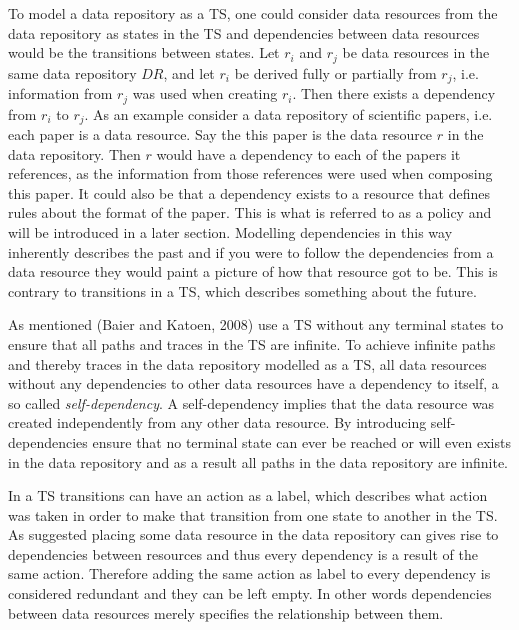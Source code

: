 To model a data repository as a TS, one could consider data resources from the data repository as states in the TS and dependencies between data resources would be the transitions between states. Let $r_i$ and $r_j$ be data resources in the same data repository $DR$, and let $r_i$ be derived fully or partially from $r_j$, i.e. information from $r_j$ was used when creating $r_i$. Then there exists a dependency from $r_i$ to $r_j$. As an example consider a data repository of scientific papers, i.e. each paper is a data resource. Say the this paper is the data resource $r$ in the data repository. Then $r$ would have a dependency to each of the papers it references, as the information from those references were used when composing this paper. It could also be that a dependency exists to a resource that defines rules about the format of the paper. This is what is referred to as a policy and will be introduced in a later section. Modelling dependencies in this way inherently describes the past and if you were to follow the dependencies from a data resource they would paint a picture of how that resource got to be. This is contrary to transitions in a TS, which describes something about the future.

As mentioned (Baier and Katoen, 2008)\cite{baier2008principles} use a TS without any terminal states to ensure that all paths and traces in the TS are infinite. To achieve infinite paths and thereby traces in the data repository modelled as a TS, all data resources without any dependencies to other data resources have a dependency to itself, a so called \emph{self-dependency}. A self-dependency implies that the data resource was created independently from any other data resource. By introducing self-dependencies ensure that no terminal state can ever be reached or will even exists in the data repository and as a result all paths in the data repository are infinite.

In a TS transitions can have an action as a label, which describes what action was taken in order to make that transition from one state to another in the TS. As suggested placing some data resource in the data repository can gives rise to dependencies between resources and thus every dependency is a result of the same action. Therefore adding the same action as label to every dependency is considered redundant and they can be left empty. In other words dependencies between data resources merely specifies the relationship between them.

